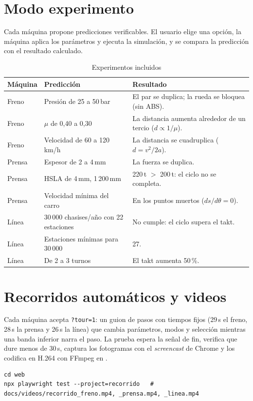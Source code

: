 \section{Modo experimento}
Cada máquina propone predicciones verificables. El usuario elige una opción, la máquina aplica los parámetros y
ejecuta la simulación, y se compara la predicción con el resultado calculado.
\begin{table}[H]\centering\small
\caption{Experimentos incluidos}\label{tab:anatomia-experimentos}
\begin{tabularx}{\linewidth}{@{}P{2.2cm} X P{4.6cm}@{}}\toprule
Máquina & Predicción & Resultado\\\midrule
Freno & Presión de 25 a 50\,bar & El par se duplica; la rueda se bloquea (sin ABS).\\
Freno & $\mu$ de 0,40 a 0,30 & La distancia aumenta alrededor de un tercio ($d \propto 1/\mu$).\\
Freno & Velocidad de 60 a 120\,km/h & La distancia se cuadruplica ($d = v^2/2a$).\\
Prensa & Espesor de 2 a 4\,mm & La fuerza se duplica.\\
Prensa & HSLA de 4\,mm, 1\,200\,mm & 220\,t $>$ 200\,t: el ciclo no se completa.\\
Prensa & Velocidad mínima del carro & En los puntos muertos ($ds/d\theta = 0$).\\
Línea & 30\,000 chasises/año con 22 estaciones & No cumple: el ciclo supera el takt.\\
Línea & Estaciones mínimas para 30\,000 & 27.\\
Línea & De 2 a 3 turnos & El takt aumenta 50\,\%.\\\bottomrule
\end{tabularx}
\end{table}

\section{Recorridos automáticos y videos}
Cada máquina acepta \texttt{?tour=1}: un guion de pasos con tiempos fijos (29\,s el freno, 28\,s la prensa y
26\,s la línea) que cambia parámetros, modos y selección mientras una banda inferior narra el paso. La prueba
 espera la señal de fin, verifica que dure menos de 30\,s, captura los fotogramas
con el \emph{screencast} de Chrome y los codifica en H.264 con FFmpeg en .
\begin{lstlisting}[style=ps]
cd web
npx playwright test --project=recorrido   # docs/videos/recorrido_freno.mp4, _prensa.mp4, _linea.mp4
\end{lstlisting}

